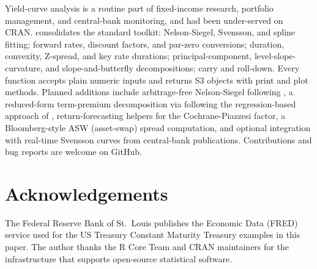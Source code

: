 Yield-curve analysis is a routine part of fixed-income research,
portfolio management, and central-bank monitoring, and had been
under-served on CRAN.  consolidates the
standard toolkit: Nelson-Siegel, Svensson, and spline fitting;
forward rates, discount factors, and par-zero conversions;
duration, convexity, Z-spread, and key rate durations;
principal-component, level-slope-curvature, and slope-and-butterfly
decompositions; carry and roll-down. Every function accepts plain
numeric inputs and returns S3 objects with print and plot methods.
Planned additions include arbitrage-free Nelson-Siegel following
\citet{christensen2011affine}, a reduced-form term-premium decomposition
via  following the regression-based
approach of \citet{adrian2013pricing}, return-forecasting helpers for the
Cochrane-Piazzesi factor, a Bloomberg-style ASW (asset-swap)
spread computation, and optional integration with real-time
Svensson curves from central-bank publications. Contributions and
bug reports are welcome on GitHub.

\section*{Acknowledgements}\label{acknowledgements}

The Federal Reserve Bank of St.~Louis publishes the Economic Data
(FRED) service used for the US Treasury Constant Maturity Treasury
examples in this paper. The author thanks the R Core Team and CRAN
maintainers for the infrastructure that supports open-source
statistical software.



\address{%
Charles Coverdale\\
Independent\\%
London, United Kingdom\\
%
\url{https://github.com/charlescoverdale/yieldcurves}\\%
%
\href{mailto:charles.f.coverdale@gmail.com}{\nolinkurl{charles.f.coverdale@gmail.com}}%
}
